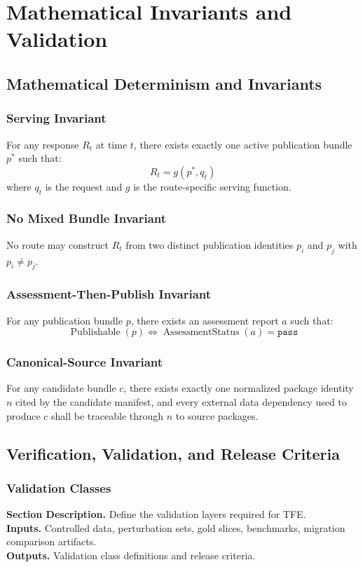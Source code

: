 \documentclass[11pt]{report}
\newcommand{\meta}[3]{\textbf{Section Description.} #1\\
\textbf{Inputs.} #2\\
\textbf{Outputs.} #3\par}
\begin{document}
\part{Mathematical Invariants and Validation}

\chapter{Mathematical Determinism and Invariants}
\section{Serving Invariant}
For any response \(R_t\) at time \(t\), there exists exactly one active publication bundle \(p^*\) such that:
\[
R_t = g(p^*, q_t)
\]
where \(q_t\) is the request and \(g\) is the route-specific serving function.

\section{No Mixed Bundle Invariant}
No route may construct \(R_t\) from two distinct publication identities \(p_i\) and \(p_j\) with \(p_i \ne p_j\).

\section{Assessment-Then-Publish Invariant}
For any publication bundle \(p\), there exists an assessment report \(a\) such that:
\[
\operatorname{Publishable}(p) \iff \operatorname{AssessmentStatus}(a)=\texttt{pass}
\]

\section{Canonical-Source Invariant}
For any candidate bundle \(c\), there exists exactly one normalized package identity \(n\) cited by the candidate manifest, and every external data dependency used to produce \(c\) shall be traceable through \(n\) to source packages.
\chapter{Verification, Validation, and Release Criteria}
\section{Validation Classes}
\meta{Define the validation layers required for TFE.}{Controlled data, perturbation sets, gold slices, benchmarks, migration comparison artifacts.}{Validation class definitions and release criteria.}
\end{document}
